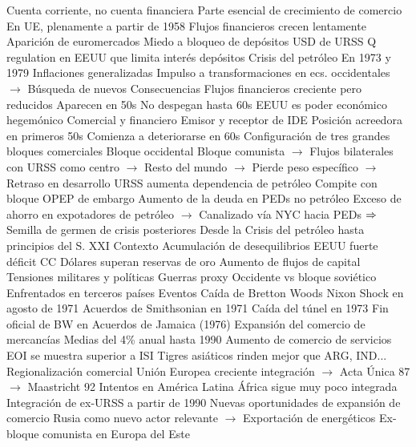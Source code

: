 \documentclass{nuevotema}
\begin{document}
\begin{esquemal}
				\4[] Cuenta corriente, no cuenta financiera
				\4[] Parte esencial de crecimiento de comercio
				\4[] En UE, plenamente a partir de 1958
				\4 Flujos financieros crecen lentamente
				\4 Aparición de euromercados
				\4[] Miedo a bloqueo de depósitos USD de URSS
				\4[] Q regulation en EEUU que limita interés depósitos
				\4 Crisis del petróleo
				\4[] En 1973 y 1979
				\4[] Inflaciones generalizadas
				\4[] Impulso a transformaciones en ecs. occidentales
				\4[] $\to$ Búsqueda de nuevos
			\3 Consecuencias
				\4 Flujos financieros creciente pero reducidos
				\4[] Aparecen en 50s
				\4[] No despegan hasta 60s
				\4 EEUU es poder económico hegemónico
				\4[] Comercial y financiero
				\4[] Emisor y receptor de IDE
				\4[] Posición acreedora en primeros 50s
				\4[] Comienza a deteriorarse en 60s
				\4 Configuración de tres grandes bloques comerciales
				\4[] Bloque occidental
				\4[] Bloque comunista
				\4[] $\to$ Flujos bilaterales con URSS como centro
				\4[] $\to$
				\4[] Resto del mundo
				\4[] $\to$ Pierde peso específico
				\4[] $\to$ Retraso en desarrollo
				\4 URSS aumenta dependencia de petróleo
				\4[] Compite con bloque OPEP de embargo
				\4 Aumento de la deuda en PEDs no petróleo
				\4[] Exceso de ahorro en expotadores de petróleo
				\4[] $\to$ Canalizado vía NYC hacia PEDs
				\4[] $\Rightarrow$ Semilla de germen de crisis posteriores
		\2 Desde la Crisis del petróleo hasta principios del S. XXI
			\3 Contexto
				\4 Acumulación de desequilibrios
				\4[] EEUU fuerte déficit CC
				\4[] Dólares superan reservas de oro
				\4 Aumento de flujos de capital
				\4 Tensiones militares y políticas
				\4 Guerras proxy
				\4[] Occidente vs bloque soviético
				\4[] Enfrentados en terceros países
			\3 Eventos
				\4 Caída de Bretton Woods
				\4[] Nixon Shock en agosto de 1971
				\4[] Acuerdos de Smithsonian en 1971
				\4[] Caída del túnel en 1973
				\4[] Fin oficial de BW en Acuerdos de Jamaica (1976)
				\4 Expansión del comercio de mercancías
				\4[] Medias del 4\% anual hasta 1990
				\4 Aumento de comercio de servicios
				\4 EOI se muestra superior a ISI
				\4[] Tigres asiáticos rinden mejor que ARG, IND...
				\4 Regionalización comercial
				\4[] Unión Europea creciente integración
				\4[] $\to$ Acta Única 87
				\4[] $\to$ Maastricht 92
				\4[] Intentos en América Latina
				\4[] África sigue muy poco integrada
				\4 Integración de ex-URSS a partir de 1990
				\4[] Nuevas oportunidades de expansión de comercio
				\4[] Rusia como nuevo actor relevante
				\4[] $\to$ Exportación de energéticos
				\4[] Ex-bloque comunista en Europa del Este

\end{esquemal}
\end{document}
